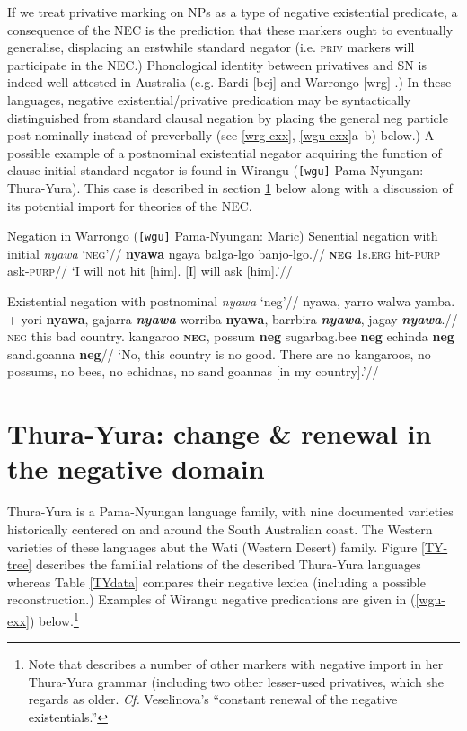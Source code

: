 \documentclass[usenames,dvipsnames,11pt]{article}
\begin{document}
{If we treat privative marking on NPs as a type of negative existential predicate, a consequence of the NEC is the prediction that these markers ought to eventually generalise, displacing an erstwhile standard negator (i.e. \textsc{priv}  markers will participate in the NEC.) Phonological identity between privatives and SN is indeed well-attested in Australia (e.g. Bardi [\gls{bcj}] \citep{Bowern2012} and Warrongo [\gls{wrg}] \citep{Tsunoda2011}.) In these languages, negative existential/privative predication may be syntactically distinguished from standard clausal negation by placing the general \gls{neg} particle post-nominally instead of preverbally (see \ref{wrg-exx}, \ref{wgu-exx}a--b) below.) A possible example of a postnominal existential negator acquiring the function of clause-initial standard negator is found in Wirangu (\texttt{[wgu]} Pama-Nyungan: Thura-Yura). This case is described in section \ref{TY} below along with a discussion of its potential import for theories of the NEC.

\pex Negation in Warrongo (\texttt{[wgu]} Pama-Nyungan: Maric)\label{wrg-exx}
\a\begingl\glpreamble Senential negation with initial \textit{nyawa} `\textsc{neg}'//
\gla \textbf{nyawa} ngaya balga-lgo banjo-lgo.//
\glb \textsc{\textbf{neg}} 1s\textsc{.erg} hit\textsc{-purp} ask\textsc{-purp}//
\glft`I will not hit [him]. [I] will ask [him].'//\endgl

\a\begingl\glpreamble Existential negation with postnominal \textit{nyawa} `\gls{neg}'//
\gla nyawa, yarro walwa yamba. + yori \textbf{nyawa}, gajarra \textit{\textbf{nyawa}} worriba \textbf{nyawa}, barrbira \textbf{\textit{nyawa}}, jagay \textbf{\textit{nyawa}}.//
\glb \textsc{neg} this bad country. kangaroo \textsc{\textbf{neg}}, possum \textbf{\gls{neg}} sugarbag.bee \textbf{\gls{neg}} echinda \textbf{\gls{neg}} sand.goanna \textbf{\gls{neg}}//
\glft`No, this country is no good. There are no kangaroos, no possums, no bees, no echidnas, no sand goannas [in my country].'//\endgl
\xe

\section{Thura-Yura: change \& renewal in the negative domain}\label{TY}

Thura-Yura is a Pama-Nyungan language family, with nine documented varieties historically centered on and around the South Australian coast. The Western varieties of these languages abut the Wati (Western Desert) family. Figure \ref{TY-tree} describes the familial relations of the described Thura-Yura languages whereas Table \ref{TYdata} compares their negative lexica (including a possible reconstruction.) Examples of Wirangu negative predications are given in (\ref{wgu-exx}) below.\footnote{Note that \citep[57]{Hercus1999} describes a number of other markers with negative import in her Thura-Yura grammar (including two other lesser-used privatives, which she regards as older. \textit{Cf.} Veselinova's \citeyearpar[173]{Veselinova2016} ``constant renewal of the negative existentials.''}



}
\end{document}
